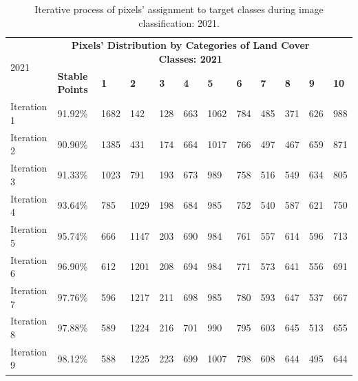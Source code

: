 \documentclass[jimaging,article,accept,pdftex,moreauthors]{Definitions/mdpi}
\begin{document}
\vspace{-6pt}
\begin{table}[H]\scriptsize  
\caption{Iterative process of pixels' assignment to target classes during image classification: 2021.}
  \centering
\begin{tabularx}{\textwidth}{p{1.6cm}p{1.8cm}p{0.55cm}p{0.55cm}p{0.55cm}p{0.55cm}p{0.55cm}p{0.55cm}p{0.55cm}p{0.55cm}p{0.55cm}p{0.9cm}}
  \toprule
  \multirow{2}{*}{2021} & \multicolumn{10}{c}{\textbf{Pixels' Distribution by Categories of Land Cover Classes: 2021}} \\
     & \textbf{Stable Points} %
     & \textbf{1} & \textbf{2} &  \textbf{3} & \textbf{4} & \textbf{5} & \textbf{6} & \textbf{7} &\textbf{ 8} & \textbf{9} & \textbf{10} \\
    \midrule
    Iteration 1 & 91.92\% & 1682    &    142    &    128    &    663    &   1062&
        784    &    485     &   371    &    626   &     988 \\
    Iteration 2 & 90.90\% & 1385    &    431    &    174    &    664    &   1017&
        766    &    497    &    467    &    659   &     871 \\
    Iteration 3 & 91.33\% & 1023   &     791     &   193   &     673    &    989&
        758    &    516    &    549      &  634    &    805 \\
    Iteration 4 & 93.64\% & 785  &     1029    &    198   &     684   &     985&
        752   &     540    &    587   &     621     &   750 \\
    Iteration 5 & 95.74\% & 666    &   1147   &     203    &    690   &     984 &
        761  &      557   &     614    &    596    &    713 \\
    Iteration 6 & 96.90\% & 612    &   1201   &     208    &    694   &     984 &
        771      &  573 &       641     &   556     &   691 \\
    Iteration 7 & 97.76\% & 596     &  1217   &     211    &    698     &   985 &
        780    &    593    &    647   &     537    &    667\\
    Iteration 8 & 97.88\% & 589   &    1224   &     216     &   701    &    990 &
        795    &    603   &     645     &   513     &   655 \\
    Iteration 9 & 98.12\% & 588   &    1225   &     223    &    699    &   1007 &
        798  &      608    &    644  &      495   &     644 \\
\bottomrule
\end{tabularx}
  
  \label{tabB3}
\end{table}
\end{document}
